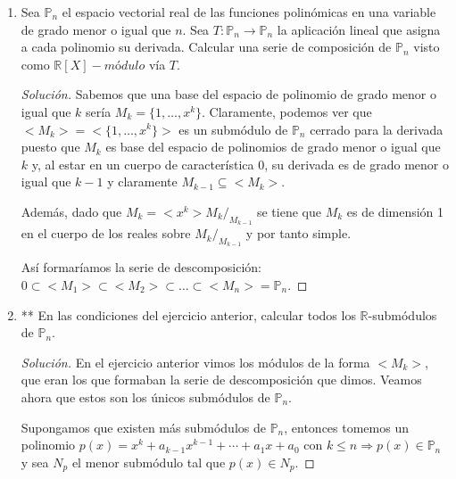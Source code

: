 \documentclass[paper=a4, fontsize=11pt, spanish]{scrartcl}
\begin{document}
\begin{enumerate}
\begin{proof}[Solución]
\begin{itemize}
				\item \textbf{Longitud 3:} $0 \subseteq N_1 \subseteq N_2 \subseteq \mathbb{R}^3$
				
				Este caso es el más fácil de todos pues nos baste con tomar $T = I_3$ para tener la descomposicón
				$0 \subseteq <(1, 0, 0)> \subseteq <(1, 0, 0), (0, 1, 0)> \subseteq \mathbb{R}^3$.
			\end{itemize}
		\end{proof}
		
		\item Sea $\mathbb{P}_n$ el espacio vectorial real de las funciones polinómicas en una variable de grado
		menor o igual que $n$. Sea $T: \mathbb{P}_n \rightarrow \mathbb{P}_n$ la aplicación lineal que asigna a
		cada polinomio su derivada. Calcular una serie de composición de $\mathbb{P}_n$ visto como $\mathbb{R}[X]
		-módulo$ vía $T$.
		\begin{proof}[Solución]
			Sabemos que una base del espacio de polinomio de grado menor o igual que $k$ sería $M_k = \{1, \dots,
			x^k\}$. Claramente, podemos ver que $<M_k> = <\{1, \dots, x^k\}>$ es un submódulo de $\mathbb{P}_n$
			cerrado para la derivada puesto que $M_k$ es base del espacio de polinomios de grado menor o igual
			que $k$ y, al estar en un cuerpo de característica 0, su derivada es de grado menor o igual que $k-1$
			y claramente $M_{k-1} \subseteq <M_k>$.
			
			Además, dado que $M_k = <x^k> M_k/_{M_{k-1}}$ se tiene que $M_k$ es de dimensión 1 en el cuerpo de
			los reales sobre $M_k/_{M_{k-1}}$ y por tanto simple.
			
			Así formaríamos la serie de descomposición: $0 \subset <M_1> \subset <M_2> \subset \dots \subset
			<M_n> = \mathbb{P}_n$.
		\end{proof}
		
		\item ** En las condiciones del ejercicio anterior, calcular todos los $\mathbb{R}$-submódulos de
		$\mathbb{P}_n$.
		\begin{proof}[Solución]
			En el ejercicio anterior vimos los módulos de la forma $<M_k>$, que eran los que formaban la serie
			de descomposición que dimos. Veamos ahora que estos son los únicos submódulos de $\mathbb{P}_n$.
			
			Supongamos que existen más submódulos de $\mathbb{P}_n$, entonces tomemos un polinomio $p(x) = x^k
			+ a_{k-1}x^{k-1} + \cdots + a_1x+a_0$ con $k \leq n \Rightarrow p(x) \in \mathbb{P}_n$ y sea $N_p$
			el menor submódulo tal que $p(x) \in N_p$.
			

\end{proof}
\end{enumerate}
\end{document}
